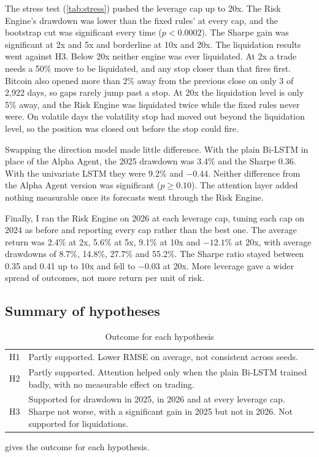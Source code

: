 The stress test (\cref{tab:stress}) pushed the leverage cap up to 20x. The Risk Engine's drawdown was lower than the fixed rules' at every cap, and the bootstrap cut was significant every time ($p<0.0002$). The Sharpe gain was significant at 2x and 5x and borderline at 10x and 20x. The liquidation results went against H3. Below 20x neither engine was ever liquidated. At 2x a trade needs a 50\% move to be liquidated, and any stop closer than that fires first. Bitcoin also opened more than 2\% away from the previous close on only 3 of 2{,}922 days, so gaps rarely jump past a stop. At 20x the liquidation level is only 5\% away, and the Risk Engine was liquidated twice while the fixed rules never were. On volatile days the volatility stop had moved out beyond the liquidation level, so the position was closed out before the stop could fire.

Swapping the direction model made little difference. With the plain Bi-LSTM in place of the Alpha Agent, the 2025 drawdown was 3.4\% and the Sharpe 0.36. With the univariate LSTM they were 9.2\% and $-0.44$. Neither difference from the Alpha Agent version was significant ($p\ge0.10$). The attention layer added nothing measurable once its forecasts went through the Risk Engine.

Finally, I ran the Risk Engine on 2026 at each leverage cap, tuning each cap on 2024 as before and reporting every cap rather than the best one. The average return was 2.4\% at 2x, 5.6\% at 5x, 9.1\% at 10x and $-12.1\%$ at 20x, with average drawdowns of 8.7\%, 14.8\%, 27.7\% and 55.2\%. The Sharpe ratio stayed between 0.35 and 0.41 up to 10x and fell to $-0.03$ at 20x. More leverage gave a wider spread of outcomes, not more return per unit of risk.

\subsection{Summary of hypotheses}

\begin{table}[!t]
  \centering
  \caption{Outcome for each hypothesis}
  \label{tab:scorecard}
  \footnotesize
  \begin{tabularx}{\columnwidth}{@{}lX@{}}
    \toprule
    H1 & Partly supported. Lower RMSE on average, not consistent across seeds. \\
    H2 & Partly supported. Attention helped only when the plain Bi-LSTM trained badly, with no measurable effect on trading. \\
    H3 & Supported for drawdown in 2025, in 2026 and at every leverage cap. Sharpe not worse, with a significant gain in 2025 but not in 2026. Not supported for liquidations. \\
    \bottomrule
  \end{tabularx}
\end{table}

 gives the outcome for each hypothesis.
